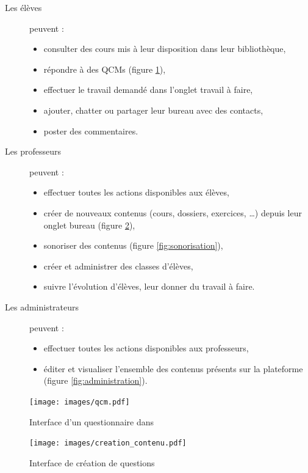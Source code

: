 \begin{description}
	\item[Les élèves] peuvent :
	\begin{itemize}
		\item consulter des cours mis à leur disposition dans leur bibliothèque,
		\item répondre à des QCMs (figure \ref{fig:qcm}),
		\item effectuer le travail demandé dans l'onglet \flqq{}travail à faire\frqq{},
		\item ajouter, chatter ou partager leur bureau avec des contacts,
		\item poster des commentaires.
	\end{itemize}
	
	\item[Les professeurs] peuvent :
	\begin{itemize}
		\item effectuer toutes les actions disponibles aux élèves,
		\item créer de nouveaux contenus (cours, dossiers, exercices, \dots{}) depuis leur onglet \flqq{}bureau\frqq{} (figure \ref{fig:creation_contenu}),
		\item sonoriser des contenus (figure \ref{fig:sonorisation}),
		\item créer et administrer des classes d'élèves,
		\item suivre l'évolution d'élèves, leur donner du travail à faire.
	\end{itemize}
	
	\item[Les administrateurs] peuvent :
	\begin{itemize}
		\item effectuer toutes les actions disponibles aux professeurs,
		\item éditer et visualiser l'ensemble des contenus présents sur la plateforme \capico{} (figure \ref{fig:administration}).
	\end{itemize}
\end{description}

\begin{figure}[H]
	\centering
	\texttt{[image: images/qcm.pdf]}
	\caption{Interface d'un questionnaire dans \capico{}}
	\label{fig:qcm}
\end{figure}

\begin{figure}[H]
	\centering
	\texttt{[image: images/creation\_contenu.pdf]}
	\caption{Interface de création de questions}
	\label{fig:creation_contenu}
\end{figure}

